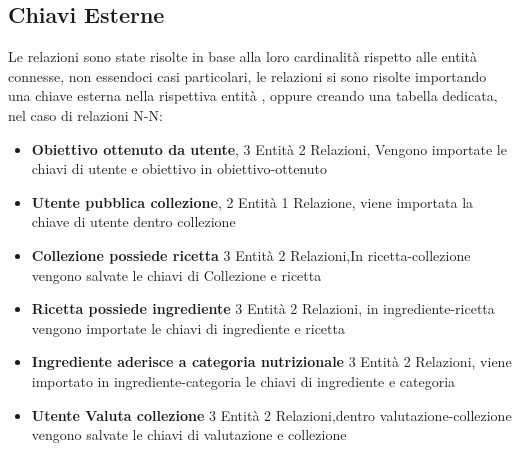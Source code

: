 ﻿\documentclass[a4paper,12pt]{report}
\begin{document}
\subsection{Chiavi Esterne}
Le relazioni sono state risolte in base alla loro cardinalità rispetto
alle entità connesse, non essendoci casi particolari, le relazioni si sono risolte
importando una chiave esterna nella rispettiva entità , oppure creando una tabella 
dedicata, nel caso di relazioni N-N:
\begin{itemize}
    \item \textbf{Obiettivo ottenuto da utente}, 3 Entità 2 Relazioni,
    Vengono importate le chiavi di utente e obiettivo in obiettivo-ottenuto
    \item \textbf{Utente pubblica collezione}, 2 Entità 1 Relazione, viene importata la chiave di utente dentro collezione
    \item \textbf{Collezione possiede ricetta} 3 Entità 2 Relazioni,In ricetta-collezione vengono salvate le chiavi di Collezione e ricetta
    \item \textbf{Ricetta possiede ingrediente} 3 Entità 2 Relazioni, in ingrediente-ricetta vengono importate le chiavi di ingrediente e ricetta
    \item \textbf{Ingrediente aderisce a categoria nutrizionale} 3 Entità 2 Relazioni, viene importato in ingrediente-categoria le chiavi di ingrediente e categoria
    \item \textbf{Utente Valuta collezione} 3 Entità 2 Relazioni,dentro valutazione-collezione vengono salvate le chiavi di valutazione e collezione
    
\end{itemize}
\end{document}

